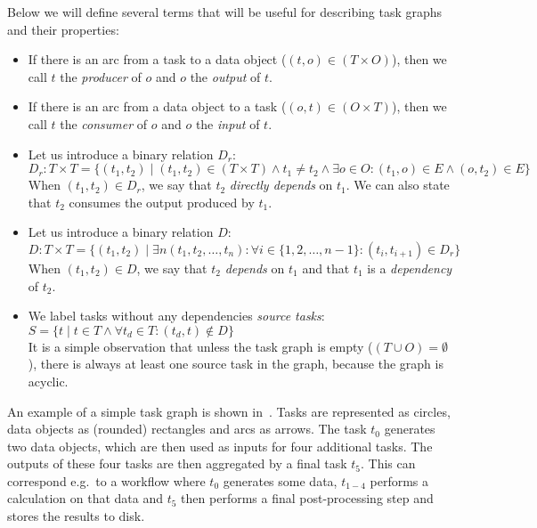 \vspace{2mm}Below we will define several terms that will be useful for describing task
graphs and their properties:
\begin{itemize}
	\item If there is an arc from a task to a data object ($(t,o) \in (T\times{}O)$), then we call
	      $t$ the \emph{producer} of $o$ and
	      $o$ the \emph{output} of $t$.
	\item If there is an arc from a data object to a task ($(o,t) \in (O\times{}T)$), then we call
	      $t$ the \emph{consumer} of $o$ and
	      $o$ the \emph{input} of $t$.

	\item Let us introduce a binary relation $D_r$: \\ $D_r: T \times T = \{(t_1, t_2) \mid (t_1, t_2)\in{}(T\times{}T)\land t_1 \neq t_2 \land
		      \exists{}o\in{}O\colon (t_1, o)\in{}E
		      \land (o, t_2)\in{}E\}$ \\ When
	      $(t_1, t_2) \in D_r$, we say that $t_2$ \emph{directly depends} on
	      $t_1$. We can also state that $t_2$ consumes the output produced
	      by $t_1$.

	\item Let us introduce a binary relation $D$: \\ $D: T \times T = \{(t_1, t_2) \mid \exists{}n (t_1, t_2, \ldots, t_n)\colon \forall i
		      \in \{1,2,\ldots,n - 1\}\colon (t_i, t_{i+1}) \in{} D_r\}$ \\ When
	      $(t_1, t_2) \in D$, we say that $t_2$ \emph{depends} on
	      $t_1$ and that $t_1$ is a \emph{dependency} of
	      $t_2$.

	\item We label tasks without any dependencies \emph{source tasks}: \\ $S = \{ t \mid t\in{}T \land
		      \forall{}t_d\in{}T\colon (t_d, t)\notin D\}$ \\ It is
	      a simple observation that unless the task graph is empty ($(T\cup{}O) = \emptyset$), there is always
	      at least one source task in the graph, because the graph is acyclic.
\end{itemize}


An example of a simple task graph is shown in~. Tasks are represented as
circles, data objects as (rounded) rectangles and arcs as arrows. The task $t_0$
generates two data objects, which are then used as inputs for four additional tasks. The outputs of
these four tasks are then aggregated by a final task $t_5$. This can correspond
e.g.\ to a workflow where $t_0$ generates some data, $t_{1-4}$
performs a calculation on that data and $t_5$ then performs a final
post-processing step and stores the results to disk.

